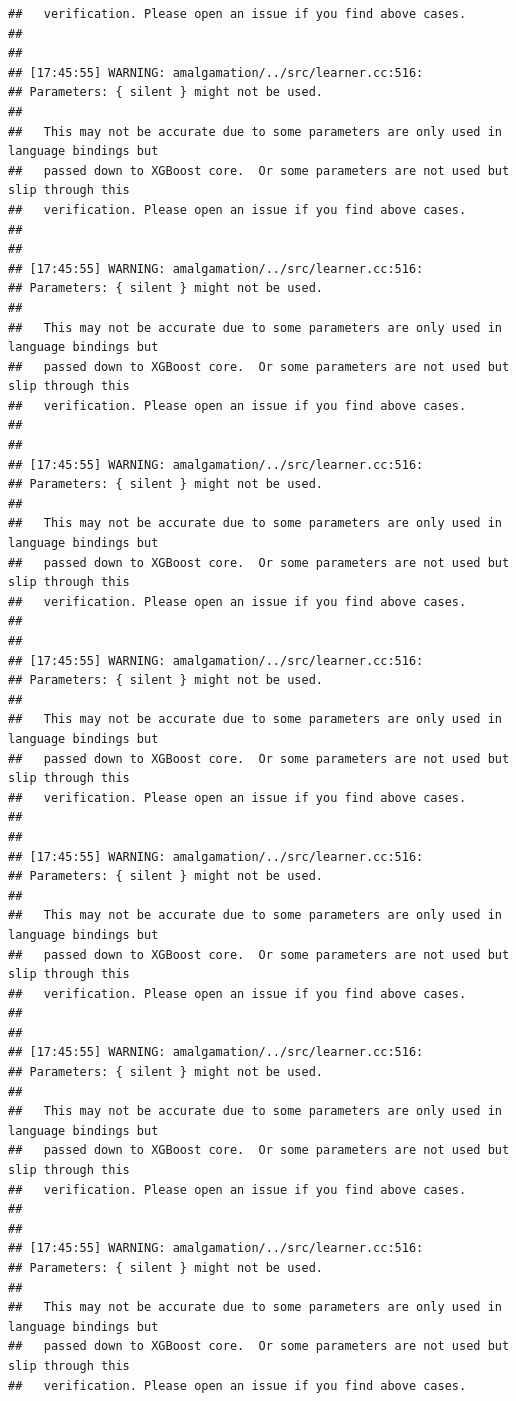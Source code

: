 \documentclass[AMS,STIX2COL]{WileyNJD-v2}\usepackage[]{graphicx}\usepackage[]{color}
\makeatletter
\newenvironment{kframe}{%
 \def\at@end@of@kframe{}%
 \ifinner\ifhmode%
  \def\at@end@of@kframe{\end{minipage}}%
  \begin{minipage}{\columnwidth}%
 \fi\fi%
 \def\FrameCommand##1{\hskip\@totalleftmargin \hskip-\fboxsep
 \colorbox{shadecolor}{##1}\hskip-\fboxsep
     \hskip-\linewidth \hskip-\@totalleftmargin \hskip\columnwidth}%
 \MakeFramed {\advance\hsize-\width
   \@totalleftmargin\z@ \linewidth\hsize
   \@setminipage}}%
 {\par\unskip\endMakeFramed%
 \at@end@of@kframe}
\newenvironment{knitrout}{}{} %
\makeatother
\begin{document}
\begin{knitrout}
\begin{kframe}
\begin{verbatim}
##   verification. Please open an issue if you find above cases.
## 
## 
## [17:45:55] WARNING: amalgamation/../src/learner.cc:516: 
## Parameters: { silent } might not be used.
## 
##   This may not be accurate due to some parameters are only used in language bindings but
##   passed down to XGBoost core.  Or some parameters are not used but slip through this
##   verification. Please open an issue if you find above cases.
## 
## 
## [17:45:55] WARNING: amalgamation/../src/learner.cc:516: 
## Parameters: { silent } might not be used.
## 
##   This may not be accurate due to some parameters are only used in language bindings but
##   passed down to XGBoost core.  Or some parameters are not used but slip through this
##   verification. Please open an issue if you find above cases.
## 
## 
## [17:45:55] WARNING: amalgamation/../src/learner.cc:516: 
## Parameters: { silent } might not be used.
## 
##   This may not be accurate due to some parameters are only used in language bindings but
##   passed down to XGBoost core.  Or some parameters are not used but slip through this
##   verification. Please open an issue if you find above cases.
## 
## 
## [17:45:55] WARNING: amalgamation/../src/learner.cc:516: 
## Parameters: { silent } might not be used.
## 
##   This may not be accurate due to some parameters are only used in language bindings but
##   passed down to XGBoost core.  Or some parameters are not used but slip through this
##   verification. Please open an issue if you find above cases.
## 
## 
## [17:45:55] WARNING: amalgamation/../src/learner.cc:516: 
## Parameters: { silent } might not be used.
## 
##   This may not be accurate due to some parameters are only used in language bindings but
##   passed down to XGBoost core.  Or some parameters are not used but slip through this
##   verification. Please open an issue if you find above cases.
## 
## 
## [17:45:55] WARNING: amalgamation/../src/learner.cc:516: 
## Parameters: { silent } might not be used.
## 
##   This may not be accurate due to some parameters are only used in language bindings but
##   passed down to XGBoost core.  Or some parameters are not used but slip through this
##   verification. Please open an issue if you find above cases.
## 
## 
## [17:45:55] WARNING: amalgamation/../src/learner.cc:516: 
## Parameters: { silent } might not be used.
## 
##   This may not be accurate due to some parameters are only used in language bindings but
##   passed down to XGBoost core.  Or some parameters are not used but slip through this
##   verification. Please open an issue if you find above cases.

\end{verbatim}
\end{kframe}
\end{knitrout}
\end{document}

